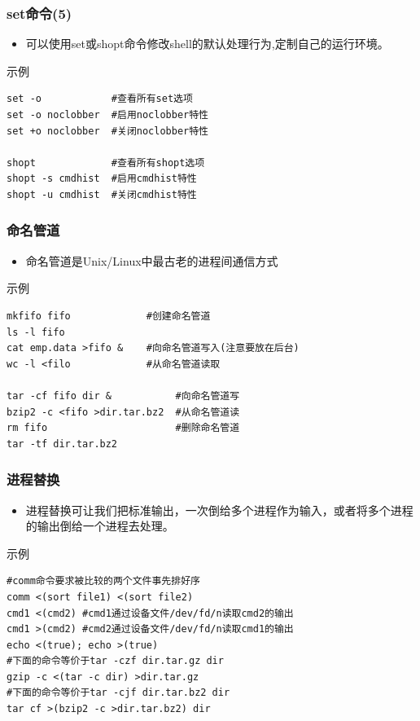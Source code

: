 \documentclass[xcolor=svgnames,presentation]{beamer}
\begin{document}
\begin{frame}[fragile]
\frametitle{set命令(5)}
\label{sec-1-2-48}
\begin{itemize}

\item 可以使用set或shopt命令修改shell的默认处理行为,定制自己的运行环境。
\label{sec-1-2-48-1}%
\end{itemize} %
\begin{exampleblock}{示例}
\label{sec-1-2-48-2}


\begin{verbatim}
set -o            #查看所有set选项
set -o noclobber  #启用noclobber特性
set +o noclobber  #关闭noclobber特性

shopt             #查看所有shopt选项
shopt -s cmdhist  #启用cmdhist特性
shopt -u cmdhist  #关闭cmdhist特性
\end{verbatim}
\end{exampleblock}
\end{frame}
\begin{frame}[fragile]
\frametitle{命名管道}
\label{sec-1-2-49}
\begin{itemize}

\item 命名管道是Unix/Linux中最古老的进程间通信方式
\label{sec-1-2-49-1}%
\end{itemize} %
\begin{exampleblock}{示例}
\label{sec-1-2-49-2}


\begin{verbatim}
mkfifo fifo             #创建命名管道
ls -l fifo
cat emp.data >fifo &    #向命名管道写入(注意要放在后台)
wc -l <filo             #从命名管道读取

tar -cf fifo dir &           #向命名管道写
bzip2 -c <fifo >dir.tar.bz2  #从命名管道读
rm fifo                      #删除命名管道
tar -tf dir.tar.bz2
\end{verbatim}
\end{exampleblock}
\end{frame}
\begin{frame}[fragile]
\frametitle{进程替换}
\label{sec-1-2-50}
\begin{itemize}

\item 进程替换可让我们把标准输出，一次倒给多个进程作为输入，或者将多个进程的输出倒给一个进程去处理。
\label{sec-1-2-50-1}%

\end{itemize} %
\begin{exampleblock}{示例}
\label{sec-1-2-50-2}


\begin{verbatim}
#comm命令要求被比较的两个文件事先排好序
comm <(sort file1) <(sort file2)
cmd1 <(cmd2) #cmd1通过设备文件/dev/fd/n读取cmd2的输出
cmd1 >(cmd2) #cmd2通过设备文件/dev/fd/n读取cmd1的输出
echo <(true); echo >(true)
#下面的命令等价于tar -czf dir.tar.gz dir
gzip -c <(tar -c dir) >dir.tar.gz
#下面的命令等价于tar -cjf dir.tar.bz2 dir
tar cf >(bzip2 -c >dir.tar.bz2) dir
\end{verbatim}
\end{exampleblock}
\end{frame}
\end{document}
